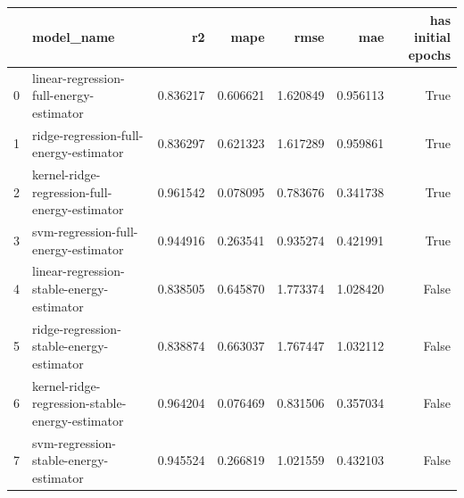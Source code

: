 \begin{tabular}{llrrrrr}
\toprule
 & model_name & r2 & mape & rmse & mae & has initial epochs \\
\midrule
0 & linear-regression-full-energy-estimator & 0.836217 & 0.606621 & 1.620849 & 0.956113 & True \\
1 & ridge-regression-full-energy-estimator & 0.836297 & 0.621323 & 1.617289 & 0.959861 & True \\
2 & kernel-ridge-regression-full-energy-estimator & 0.961542 & 0.078095 & 0.783676 & 0.341738 & True \\
3 & svm-regression-full-energy-estimator & 0.944916 & 0.263541 & 0.935274 & 0.421991 & True \\
4 & linear-regression-stable-energy-estimator & 0.838505 & 0.645870 & 1.773374 & 1.028420 & False \\
5 & ridge-regression-stable-energy-estimator & 0.838874 & 0.663037 & 1.767447 & 1.032112 & False \\
6 & kernel-ridge-regression-stable-energy-estimator & 0.964204 & 0.076469 & 0.831506 & 0.357034 & False \\
7 & svm-regression-stable-energy-estimator & 0.945524 & 0.266819 & 1.021559 & 0.432103 & False \\
\bottomrule
\end{tabular}
